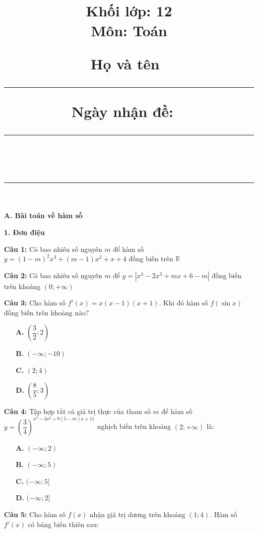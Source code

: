\documentclass[12pt, a4paper]{article}
\title{\vspace{-1.5cm}{\huge\textbf{Chuyên đề: Khảo sát hàm số}}\\[3mm]
		{\LARGE Khối lớp: 12}\\[2mm]
		{\LARGE Môn: Toán}\\[1.5mm]
{\normalsize Họ và tên~\rule{3cm}{1pt} \hfill Ngày nhận đề: ~\rule{3cm}{1pt}}\\[4mm]
\hrule
}
\author{}
\date{}
\begin{document}
\maketitle
\vspace{-2.25cm}


\textbf{A. Bài toán về hàm số } 
\vspace{-0.25cm}


	\textbf{1. Đơn điệu}

\vspace{-0.2cm}
	
		\textbf{Câu 1: } Có bao nhiêu số nguyên $m$ để hàm số $y=(1-m)^2x^3+(m-1)x^2+x+4$ đồng biến trên $\mathbb{R}$
	
		\textbf{Câu 2: } Có bao nhiêu số nguyên $m$ để $y=\left|x^4-2x^3+mx+6-m\right|$ đồng biến trên khoảng $(0;+\infty)$
		
		\textbf{Câu 3: } Cho hàm số $f'(x)=x(x-1)(x+1).$ Khi đó hàm số $f(\sin x)$ đồng biến trên khoảng nào?
			\begin{multicols}{4}
				\begin{enumerate}
					\item[\textbf{A.}] $\left(\dfrac{3}{2};2\right)$
					\item[\textbf{B.}] $(-\infty;-10)$
					\item[\textbf{C.}] $(2;4)$
					\item[\textbf{D.}] $\left(\dfrac{8}{5};3\right)$
				\end{enumerate}
			\end{multicols}
			
		\textbf{Câu 4: } Tập hợp tất cả giá trị thực của tham số $m$ để hàm số $y=\left(\dfrac{3}{4}\right)^{x^3-3x^2+9(5-m)x+11}$ nghịch biến trên khoảng $(2;+\infty)$ là:
			\begin{multicols}{4}
				\begin{enumerate}
					\item[\textbf{A.}] $(-\infty;2)$
					\item[\textbf{B.}] $(-\infty;5)$
					\item[\textbf{C.}] $(-\infty;5]$
					\item[\textbf{D.}] $(-\infty;2]$
				\end{enumerate}
			\end{multicols}
		
		\textbf{Câu 5: } Cho hàm số $f(x)$ nhận giá trị dương trên khoảng $(1;4)$. Hàm số $f'(x)$ có bảng biến thiên sau:
		
\end{document}
